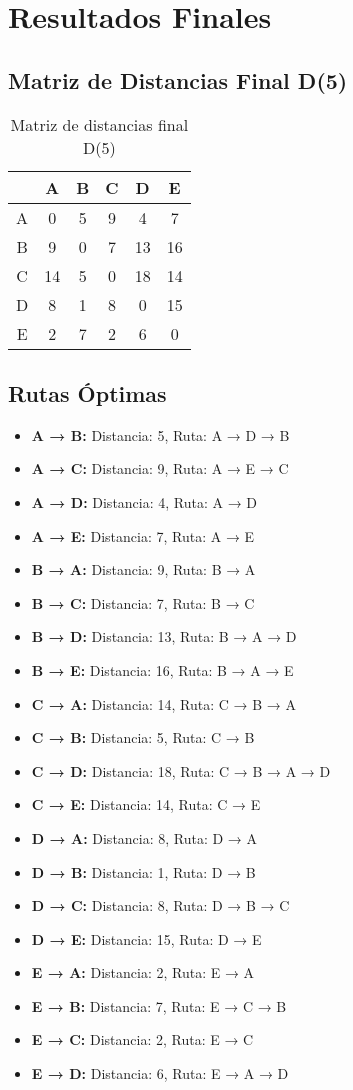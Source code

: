\documentclass[12pt]{article}
\begin{document}
\section{Resultados Finales}
\subsection{Matriz de Distancias Final D(5)}
\begin{table}[h!]
\centering
\begin{tabular}{|c|c|c|c|c|c|}
\hline
 & A & B & C & D & E \\\hline
A & 0 & 5 & 9 & 4 & 7 \\\hline
B & 9 & 0 & 7 & 13 & 16 \\\hline
C & 14 & 5 & 0 & 18 & 14 \\\hline
D & 8 & 1 & 8 & 0 & 15 \\\hline
E & 2 & 7 & 2 & 6 & 0 \\\hline
\end{tabular}
\caption{Matriz de distancias final D(5)}
\end{table}

\subsection{Rutas Óptimas}
\begin{itemize}
\item \textbf{A → B:} Distancia: 5, Ruta: A → D → B
\item \textbf{A → C:} Distancia: 9, Ruta: A → E → C
\item \textbf{A → D:} Distancia: 4, Ruta: A → D
\item \textbf{A → E:} Distancia: 7, Ruta: A → E
\item \textbf{B → A:} Distancia: 9, Ruta: B → A
\item \textbf{B → C:} Distancia: 7, Ruta: B → C
\item \textbf{B → D:} Distancia: 13, Ruta: B → A → D
\item \textbf{B → E:} Distancia: 16, Ruta: B → A → E
\item \textbf{C → A:} Distancia: 14, Ruta: C → B → A
\item \textbf{C → B:} Distancia: 5, Ruta: C → B
\item \textbf{C → D:} Distancia: 18, Ruta: C → B → A → D
\item \textbf{C → E:} Distancia: 14, Ruta: C → E
\item \textbf{D → A:} Distancia: 8, Ruta: D → A
\item \textbf{D → B:} Distancia: 1, Ruta: D → B
\item \textbf{D → C:} Distancia: 8, Ruta: D → B → C
\item \textbf{D → E:} Distancia: 15, Ruta: D → E
\item \textbf{E → A:} Distancia: 2, Ruta: E → A
\item \textbf{E → B:} Distancia: 7, Ruta: E → C → B
\item \textbf{E → C:} Distancia: 2, Ruta: E → C
\item \textbf{E → D:} Distancia: 6, Ruta: E → A → D
\end{itemize}
\end{document}
